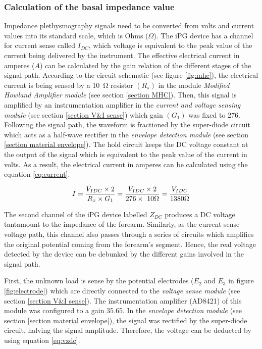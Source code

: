 \subsubsection{Calculation of the basal impedance value}
Impedance plethysmography signals need to be converted from volts and current values into its standard scale, which is Ohms ($\Omega$). The iPG device has a channel for current sense called $I_{DC}$, which voltage is equivalent to the peak value of the current being delivered by the instrument. The effective electrical current in amperes ($A$) can be calculated by the gain relation of the different stages of the signal path. According to the circuit schematic (see figure \ref{fig:mhc}), the electrical current is being sensed by a \SI{10}{\ohm} resistor $(R_s)$ in the module \textit{Modified Howland Amplifier module} (see section \ref{section MHC}). Then, this signal is amplified by an instrumentation amplifier in the \textit{current and voltage sensing module} (see section \ref{section V&I sense}) which gain $(G_1)$ was fixed to \num{276}. Following the signal path, the waveform is fractioned by the super-diode circuit which acts as a half-wave rectifier in the \textit{envelope detection module} (see section \ref{section material envelope}). The hold circuit keeps the DC voltage constant at the output of the signal which is equivalent to the peak value of the current in volts. As a result, the electrical current in amperes can be calculated using the equation \ref{eq:current}.

\begin{align}
	\label{eq:current}
	I = \frac{V_{IDC} \times 2}{R_x \times G_1} = \frac{V_{IDC} \times 2}{276 \times\ 10 \Omega} = \frac{V_{IDC}}{1380 \Omega} \tagaddtext{[\si{\ampere}]}
\end{align}


The second channel of the iPG device labelled $Z_{DC}$ produces a DC voltage tantamount to the impedance of the forearm. Similarly, as the current sense voltage path, this channel also passes through a series of circuits which amplifies the original potential coming from the forearm's segment. Hence, the real voltage detected by the device can be debunked by the different gains involved in the signal path. 

First, the unknown load is sense by the potential electrodes ($E_2$ and $E_3$ in figure \ref{fig:electrode}) which are directly connected to the \textit{voltage sense module} (see section \ref{section V&I sense}). The instrumentation amplifier (AD8421) of this module was configured to a gain \num{35.65}. In the \textit{envelope detection module} (see section \ref{section material envelope}), the signal was rectified by the super-diode circuit, halving the signal amplitude. Therefore, the voltage can be deducted by using equation \ref{eq:vzdc}.

